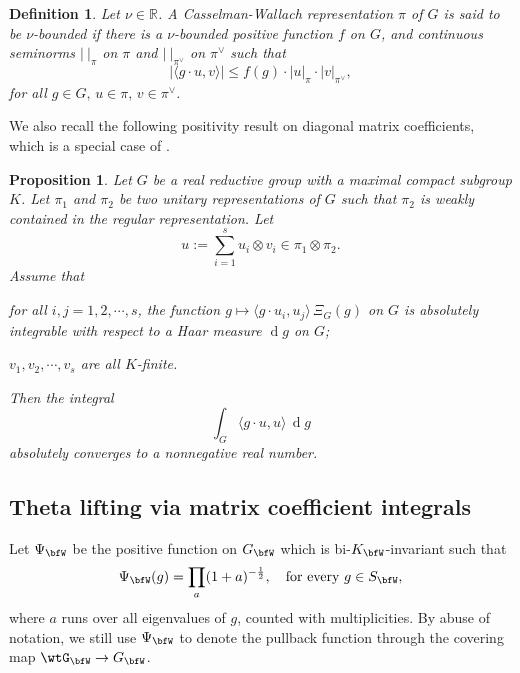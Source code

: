 \documentclass[12pt,a4paper]{amsart}
\def\abs#1{\left|{#1}\right|}
\newcommand{\od}{\operatorname{d}}
\newcommand{\R}{\mathbb R}
\newcommand{\la}{\langle}
\newcommand{\ra}{\rangle}
\numberwithin{equation}{section}
\newtheorem{lem}[thm]{Lemma}
\newtheorem{prpl}[thm]{Proposition}
\newtheorem{dfnl}[thm]{Definition}
\theoremstyle{remark}
\def\abfV{\bfV'}
\begin{document}
\begin{dfnl}
  Let $\nu\in \R$. A Casselman-Wallach representation $\pi$ of $G$ is said to be
  \emph{$\nu$-bounded} if there is a $\nu$-bounded positive function $f$ on $G$,
  and continuous seminorms $\abs{\ }_\pi$ on $\pi$ and $\abs{\ }_{\pi^\vee}$ on
  $\pi^\vee$ such that
  \[
    \abs{\la g\cdot u,v\ra}\leq f(g) \cdot \abs{u}_\pi \cdot \abs{v}_{\pi^\vee},
  \]
  for all $g\in G, \, u\in \pi, \, v\in \pi^\vee$.
\end{dfnl}


We also recall the following positivity result on diagonal matrix coefficients, which is a special case of \cite[Theorem A. 5]{HLS}.

\begin{prpl}\label{positivity}
Let $G$ be a real reductive group with a maximal compact subgroup $K$. Let $\pi_1$ and $\pi_2$ be two unitary representations of $G$ such that $\pi_2$ is weakly
contained in the regular representation.
Let
\[
u:=\sum_{i=1}^s u_i\otimes v_i\in \pi_1\otimes \pi_2.
\]
Assume that
\begin{enumC}
\item for all $i,j=1,2,\cdots, s$, the function
  $g\mapsto \la g \cdot u_i, u_j\ra\,\Xi_G (g)$ on $G$ is absolutely integrable with
  respect to a Haar measure $\od\! g$ on $G$;
\item
  $v_1,v_2,\cdots, v_s$ are all $K$-finite.
\end{enumC}
Then the integral
\[%
\int_G \la g\cdot u,u \rangle\,\od\! g
\]%
absolutely converges to a nonnegative real number.
\end{prpl}

\subsection{Theta lifting via matrix coefficient integrals}\label{sec:MCI}

\medskip

Let $\Psi_{\bfW}$ be the positive function on $G_{\bfW}$ which is bi-$K_{\bfW}$-invariant such that
  \[
  \Psi_{\bfW}(g)=\prod_{a} (1+a)^{-\frac{1}{2}}, \quad \textrm{for every } g\in S_{\bfW},
  \]
  where $a$ runs over all eigenvalues of $g$, counted with multiplicities. By abuse of notation, we still use $\Psi_{\bfW}$ to denote the pullback function through the covering map $\wtG_{\bfW}\rightarrow G_{\bfW}$.
\end{document}
